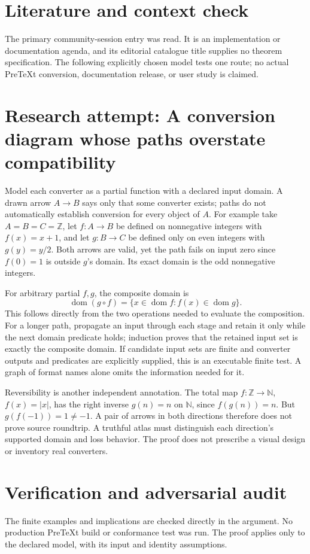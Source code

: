 \documentclass[11pt]{article}
\begin{document}
\section{Literature and context check}
The primary community-session entry was read. It is an implementation or documentation agenda, and its editorial catalogue title supplies no theorem specification. The following explicitly chosen model tests one route; no actual PreTeXt conversion, documentation release, or user study is claimed.
\section{Research attempt: A conversion diagram whose paths overstate compatibility}
Model each converter as a partial function with a declared input domain. A drawn arrow $A\to B$ says only that some converter exists; paths do not automatically establish conversion for every object of $A$. For example take $A=B=C=\mathbb Z$, let $f:A\to B$ be defined on nonnegative integers with $f(x)=x+1$, and let $g:B\to C$ be defined only on even integers with $g(y)=y/2$. Both arrows are valid, yet the path fails on input zero since $f(0)=1$ is outside $g$'s domain. Its exact domain is the odd nonnegative integers.

For arbitrary partial $f,g$, the composite domain is
\[
\operatorname{dom}(g\circ f)=\{x\in\operatorname{dom}f:f(x)\in\operatorname{dom}g\}.
\]
This follows directly from the two operations needed to evaluate the composition. For a longer path, propagate an input through each stage and retain it only while the next domain predicate holds; induction proves that the retained input set is exactly the composite domain. If candidate input sets are finite and converter outputs and predicates are explicitly supplied, this is an executable finite test. A graph of format names alone omits the information needed for it.

Reversibility is another independent annotation. The total map $f:\mathbb Z\to\mathbb N$, $f(x)=|x|$, has the right inverse $g(n)=n$ on $\mathbb N$, since $f(g(n))=n$. But $g(f(-1))=1\ne-1$. A pair of arrows in both directions therefore does not prove source roundtrip. A truthful atlas must distinguish each direction's supported domain and loss behavior. The proof does not prescribe a visual design or inventory real converters.
\section{Verification and adversarial audit}
The finite examples and implications are checked directly in the argument. No production PreTeXt build or conformance test was run. The proof applies only to the declared model, with its input and identity assumptions.
\end{document}

